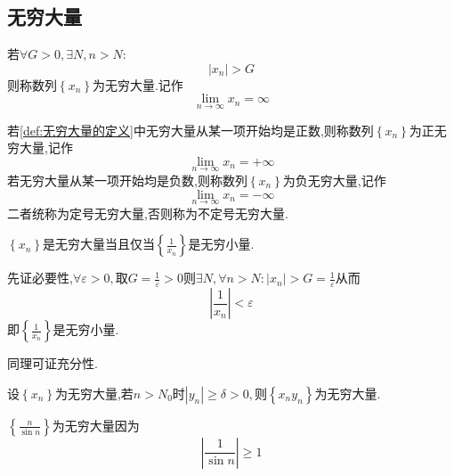 \subsection{无穷大量}
\begin{formal}
    \begin{definition}[无穷大量的定义]\label{def:无穷大量的定义}
        若$\forall G>0,\exists N,n>N:$\[
        \left|x_n\right|>G
        \]则称数列$\left\{x_n\right\}$为无穷大量.记作\[
        \lim_{n\to\infty}x_n=\infty
        \]
    \end{definition}
\end{formal}
\begin{formal}
    \begin{definition}[定号无穷大量]\label{def:定号无穷大量}
        若\cref{def:无穷大量的定义}中无穷大量从某一项开始均是正数,则称数列$\left\{x_n\right\}$为正无穷大量,记作\[
        \lim_{n\to\infty}x_n=+\infty
        \]若无穷大量从某一项开始均是负数,则称数列$\left\{x_n\right\}$为负无穷大量,记作\[
        \lim_{n\to\infty}x_n=-\infty
        \]二者统称为定号无穷大量,否则称为不定号无穷大量.
    \end{definition}
\end{formal}
\begin{formal}
    \begin{theorem}[无穷大与无穷小]\label{thm:无穷大与无穷小}
        $\left\{x_n\right\}$是无穷大量当且仅当$\displaystyle \left\{\frac{1}{x_n}\right\}$是无穷小量.
    \end{theorem}
    \begin{Proof}
        先证必要性,$\forall \varepsilon>0,$取$\displaystyle G=\frac{1}{\varepsilon}>0$则$\displaystyle\exists N,\forall n>N:\left|x_n\right|>G=\frac{1}{\varepsilon}$从而\[
        \left|\frac{1}{x_n}\right|<\varepsilon
        \]即$\displaystyle\left\{\frac{1}{x_n}\right\}$是无穷小量.

        同理可证充分性.
    \end{Proof}
\end{formal}
\begin{formal}
    \begin{theorem}[无穷大量与非零量]\label{thm:无穷大量与非零量}
        设$\left\{x_n\right\}$为无穷大量,若$n>N_0$时$\left|y_n\right|\geqslant\delta>0,$则$\left\{x_ny_n\right\}$为无穷大量.
    \end{theorem}
\end{formal}
\begin{brown}
    \begin{example}
        $\displaystyle \left\{\frac{n}{\sin n}\right\}$为无穷大量因为\[
        \left|
            \frac{1}{\sin n}
        \right|\geqslant 1
        \]
    \end{example}
\end{brown}

